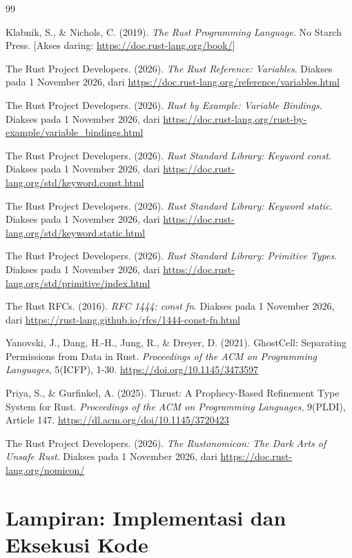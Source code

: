 \documentclass[11pt,a4paper]{article}
\begin{document}
\begin{thebibliography}{99}
	\raggedright
	Klabnik, S., \& Nichols, C. (2019). \textit{The Rust Programming Language}. No Starch Press.
		[Akses daring: \url{https://doc.rust-lang.org/book/}]

	The Rust Project Developers. (2026). \textit{The Rust Reference: Variables}.
	Diakses pada 1 November 2026, dari \url{https://doc.rust-lang.org/reference/variables.html}

	The Rust Project Developers. (2026). \textit{Rust by Example: Variable Bindings}.
	Diakses pada 1 November 2026, dari \url{https://doc.rust-lang.org/rust-by-example/variable_bindings.html}

	The Rust Project Developers. (2026). \textit{Rust Standard Library: Keyword const}.
	Diakses pada 1 November 2026, dari \url{https://doc.rust-lang.org/std/keyword.const.html}

	The Rust Project Developers. (2026). \textit{Rust Standard Library: Keyword static}.
	Diakses pada 1 November 2026, dari \url{https://doc.rust-lang.org/std/keyword.static.html}

	The Rust Project Developers. (2026). \textit{Rust Standard Library: Primitive Types}.
	Diakses pada 1 November 2026, dari \url{https://doc.rust-lang.org/std/primitive/index.html}

	The Rust RFCs. (2016). \textit{RFC 1444: const fn}.
	Diakses pada 1 November 2026, dari \url{https://rust-lang.github.io/rfcs/1444-const-fn.html}

	Yanovski, J., Dang, H.-H., Jung, R., \& Dreyer, D. (2021). GhostCell: Separating Permissions from Data in Rust. \textit{Proceedings of the ACM on Programming Languages}, 5(ICFP), 1-30.
	\url{https://doi.org/10.1145/3473597}

	Priya, S., \& Gurfinkel, A. (2025). Thrust: A Prophecy-Based Refinement Type System for Rust. \textit{Proceedings of the ACM on Programming Languages}, 9(PLDI), Article 147.
	\url{https://dl.acm.org/doi/10.1145/3720423}

	The Rust Project Developers. (2026). \textit{The Rustonomicon: The Dark Arts of Unsafe Rust}.
	Diakses pada 1 November 2026, dari \url{https://doc.rust-lang.org/nomicon/}
\end{thebibliography}

\newpage
\section*{Lampiran: Implementasi dan Eksekusi Kode}
\end{document}
